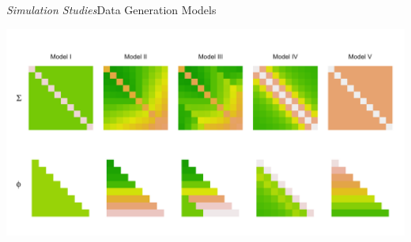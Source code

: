 \begin{frame}[c]{\emph{Simulation Studies}}{Data Generation Models}

\begin{center}
  \includegraphics[width = \textwidth]{img/chapter-4/cov-cholesky-grid-beamer}%
\end{center}

\end{frame}

